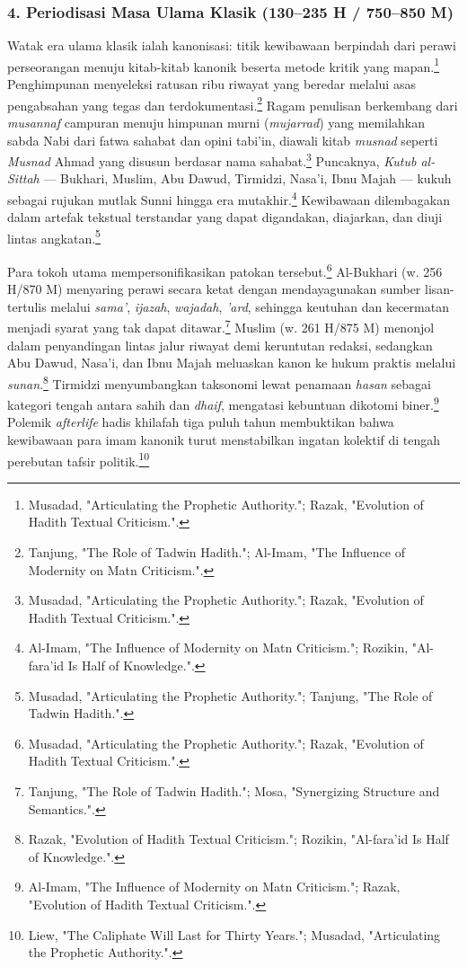 \subsubsection*{4. Periodisasi Masa Ulama Klasik (130--235 H / 750--850 M)}

Watak era ulama klasik ialah kanonisasi: titik kewibawaan berpindah dari perawi perseorangan menuju kitab-kitab kanonik beserta metode kritik yang mapan.\footnote{Musadad, "Articulating the Prophetic Authority."; Razak, "Evolution of Hadith Textual Criticism.".} Penghimpunan menyeleksi ratusan ribu riwayat yang beredar melalui asas pengabsahan yang tegas dan terdokumentasi.\footnote{Tanjung, "The Role of Tadwin Hadith."; Al-Imam, "The Influence of Modernity on Matn Criticism.".} Ragam penulisan berkembang dari \textit{musannaf} campuran menuju himpunan murni (\textit{mujarrad}) yang memilahkan sabda Nabi dari fatwa sahabat dan opini tabi'in, diawali kitab \textit{musnad} seperti \textit{Musnad} Ahmad yang disusun berdasar nama sahabat.\footnote{Musadad, "Articulating the Prophetic Authority."; Razak, "Evolution of Hadith Textual Criticism.".} Puncaknya, \textit{Kutub al-Sittah} --- Bukhari, Muslim, Abu Dawud, Tirmidzi, Nasa'i, Ibnu Majah --- kukuh sebagai rujukan mutlak Sunni hingga era mutakhir.\footnote{Al-Imam, "The Influence of Modernity on Matn Criticism."; Rozikin, "Al-fara'id Is Half of Knowledge.".} Kewibawaan dilembagakan dalam artefak tekstual terstandar yang dapat digandakan, diajarkan, dan diuji lintas angkatan.\footnote{Musadad, "Articulating the Prophetic Authority."; Tanjung, "The Role of Tadwin Hadith.".}

Para tokoh utama mempersonifikasikan patokan tersebut.\footnote{Musadad, "Articulating the Prophetic Authority."; Razak, "Evolution of Hadith Textual Criticism.".} Al-Bukhari (w. 256 H/870 M) menyaring perawi secara ketat dengan mendayagunakan sumber lisan-tertulis melalui \textit{sama'}, \textit{ijazah}, \textit{wajadah}, \textit{'ard}, sehingga keutuhan dan kecermatan menjadi syarat yang tak dapat ditawar.\footnote{Tanjung, "The Role of Tadwin Hadith."; Mosa, "Synergizing Structure and Semantics.".} Muslim (w. 261 H/875 M) menonjol dalam penyandingan lintas jalur riwayat demi keruntutan redaksi, sedangkan Abu Dawud, Nasa'i, dan Ibnu Majah meluaskan kanon ke hukum praktis melalui \textit{sunan}.\footnote{Razak, "Evolution of Hadith Textual Criticism."; Rozikin, "Al-fara'id Is Half of Knowledge.".} Tirmidzi menyumbangkan taksonomi lewat penamaan \textit{hasan} sebagai kategori tengah antara sahih dan \textit{dhaif}, mengatasi kebuntuan dikotomi biner.\footnote{Al-Imam, "The Influence of Modernity on Matn Criticism."; Razak, "Evolution of Hadith Textual Criticism.".} Polemik \textit{afterlife} hadis khilafah tiga puluh tahun membuktikan bahwa kewibawaan para imam kanonik turut menstabilkan ingatan kolektif di tengah perebutan tafsir politik.\footnote{Liew, "The Caliphate Will Last for Thirty Years."; Musadad, "Articulating the Prophetic Authority.".}

